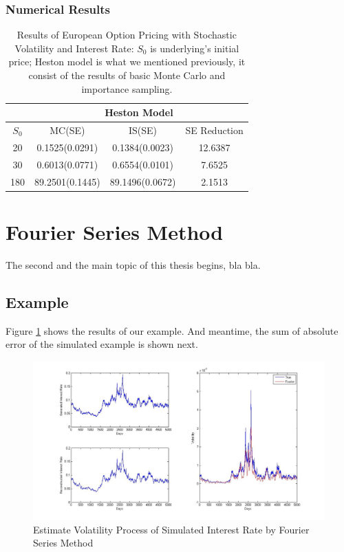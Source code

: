 \documentclass[12pt]{article}  %
\numberwithin{equation}{subsection}
\theoremstyle{plain}
\begin{document}
\subsubsection{Numerical Results}
\begin{table}[h]
\begin{center}
\begin{tabular}{cccc}\toprule
\ & \multicolumn{3}{c}{Heston Model} \\ \midrule
$S_0$ & MC(SE) & IS(SE) & SE Reduction \\ \midrule
20 & 0.1525(0.0291) & 0.1384(0.0023) & 12.6387 \\
30 & 0.6013(0.0771) & 0.6554(0.0101) & 7.6525 \\
180 & 89.2501(0.1445) & 89.1496(0.0672) & 2.1513 \\ \bottomrule
\end{tabular}
\caption[Results of European Option Pricing with Stochastic Volatility and Interest Rate]{Results of European Option Pricing with Stochastic Volatility and Interest Rate: $S_0$ is underlying's initial price; Heston model is what we mentioned previously, it consist of the results of basic Monte Carlo and importance sampling.}
\end{center}
\end{table}

\section{Fourier Series Method}
The second and the main topic of this thesis begins, bla bla.

\subsection{Example}
Figure \ref{FV} shows the results of our example. And meantime, the sum of absolute error of the simulated example is shown next.
\begin{figure}[h]  %
\includegraphics[width=15cm]{Fourier_Vasicek.jpg}
\caption{Estimate Volatility Process of Simulated Interest Rate by Fourier Series Method} \label{FV}
\end{figure}
\end{document}
